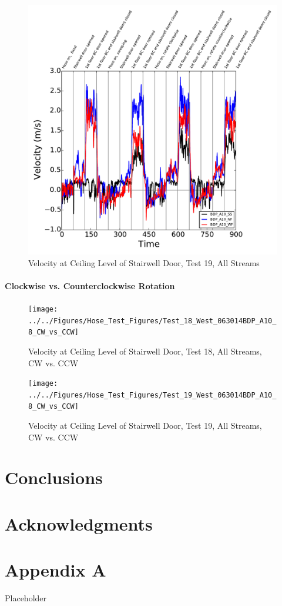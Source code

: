 \documentclass[12pt,oneside]{book}
\begin{document}
\begin{figure}[!ht]
\includegraphics[width=6in]{../../Figures/Hose_Test_Figures/Test_19_West_063014BDP_A10_8_All_Streams}
\caption{Velocity at Ceiling Level of Stairwell Door, Test 19, All Streams}
\label{fig:Test_19_West_063014_SS_BDP_A10}
\end{figure}

\clearpage

\subsubsection{Clockwise vs. Counterclockwise Rotation}

\begin{figure}[!ht]
\texttt{[image: ../../Figures/Hose\_Test\_Figures/Test\_18\_West\_063014BDP\_A10\_8\_CW\_vs\_CCW]}
\caption{Velocity at Ceiling Level of Stairwell Door, Test 18, All Streams, CW vs. CCW}
\label{fig:Test_18_West_063014_SS_BDP_A10}
\end{figure}

\begin{figure}[!ht]
\texttt{[image: ../../Figures/Hose\_Test\_Figures/Test\_19\_West\_063014BDP\_A10\_8\_CW\_vs\_CCW]}
\caption{Velocity at Ceiling Level of Stairwell Door, Test 19, All Streams, CW vs. CCW}
\label{fig:Test_19_West_063014_SS_BDP_A10}
\end{figure}

\clearpage



\chapter{Conclusions}
\label{chap:Conclusions}

\chapter{Acknowledgments}
\label{chap:Acknowledgments}



\appendix

\chapter{Appendix A}

Placeholder
\end{document}
